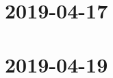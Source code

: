\documentclass{ccg-notes}
\author{Colton Grainger}
\date{\today}
\begin{document}
\frontstuff

\section{2019-04-17}
    

\section{2019-04-19}
    
\end{document}
